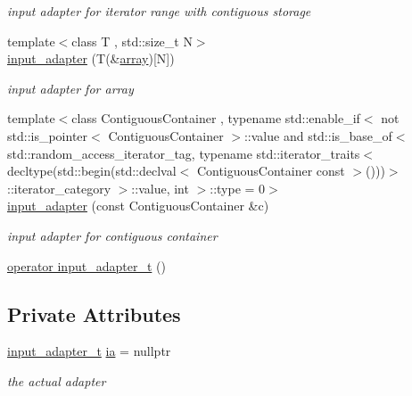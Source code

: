 \begin{DoxyCompactItemize}
\begin{DoxyCompactList}\small\item\em input adapter for iterator range with contiguous storage \end{DoxyCompactList}\item 
{\footnotesize template$<$class T , std\+::size\+\_\+t N$>$ }\\\hyperlink{classnlohmann_1_1detail_1_1input__adapter_aa2392138bf8307df1994dc7eb22d51ce}{input\+\_\+adapter} (T(\&\hyperlink{namespacenlohmann_1_1detail_a1ed8fc6239da25abcaf681d30ace4985af1f713c9e000f5d3f280adbd124df4f5}{array})\mbox{[}N\mbox{]})
\begin{DoxyCompactList}\small\item\em input adapter for array \end{DoxyCompactList}\item 
{\footnotesize template$<$class Contiguous\+Container , typename std\+::enable\+\_\+if$<$ not std\+::is\+\_\+pointer$<$ Contiguous\+Container $>$\+::value and std\+::is\+\_\+base\+\_\+of$<$ std\+::random\+\_\+access\+\_\+iterator\+\_\+tag, typename std\+::iterator\+\_\+traits$<$ decltype(std\+::begin(std\+::declval$<$ Contiguous\+Container const $>$()))$>$\+::iterator\+\_\+category $>$\+::value, int $>$\+::type  = 0$>$ }\\\hyperlink{classnlohmann_1_1detail_1_1input__adapter_a6f92fe82cb49a508dbfb297c5630cc7f}{input\+\_\+adapter} (const Contiguous\+Container \&c)
\begin{DoxyCompactList}\small\item\em input adapter for contiguous container \end{DoxyCompactList}\item 
\hyperlink{classnlohmann_1_1detail_1_1input__adapter_a4ef04b9490247fc38f3d1c2a9e18789b}{operator input\+\_\+adapter\+\_\+t} ()
\end{DoxyCompactItemize}
\subsection*{Private Attributes}
\begin{DoxyCompactItemize}
\item 
\hyperlink{namespacenlohmann_1_1detail_ae132f8cd5bb24c5e9b40ad0eafedf1c2}{input\+\_\+adapter\+\_\+t} \hyperlink{classnlohmann_1_1detail_1_1input__adapter_ad5a11d0b65b68f6950cfbe8c8366b7da}{ia} = nullptr
\begin{DoxyCompactList}\small\item\em the actual adapter \end{DoxyCompactList}\end{DoxyCompactItemize}


